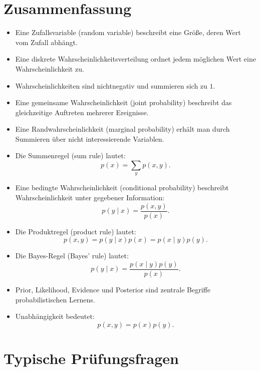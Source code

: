 \section{Zusammenfassung}

\begin{itemize}
    \item Eine Zufallsvariable (random variable) beschreibt eine Größe, deren Wert vom Zufall abhängt.
    \item Eine diskrete Wahrscheinlichkeitsverteilung ordnet jedem möglichen Wert eine Wahrscheinlichkeit zu.
    \item Wahrscheinlichkeiten sind nichtnegativ und summieren sich zu \(1\).
    \item Eine gemeinsame Wahrscheinlichkeit (joint probability) beschreibt das gleichzeitige Auftreten mehrerer Ereignisse.
    \item Eine Randwahrscheinlichkeit (marginal probability) erhält man durch Summieren über nicht interessierende Variablen.
    \item Die Summenregel (sum rule) lautet:
    \[
        p(x) = \sum_y p(x,y).
    \]
    \item Eine bedingte Wahrscheinlichkeit (conditional probability) beschreibt Wahrscheinlichkeit unter gegebener Information:
    \[
        p(y \mid x) = \frac{p(x,y)}{p(x)}.
    \]
    \item Die Produktregel (product rule) lautet:
    \[
        p(x,y) = p(y \mid x)p(x) = p(x \mid y)p(y).
    \]
    \item Die Bayes-Regel (Bayes' rule) lautet:
    \[
        p(y \mid x)
        =
        \frac{p(x \mid y)p(y)}{p(x)}.
    \]
    \item Prior, Likelihood, Evidence und Posterior sind zentrale Begriffe probabilistischen Lernens.
    \item Unabhängigkeit bedeutet:
    \[
        p(x,y) = p(x)p(y).
    \]
\end{itemize}

\section{Typische Prüfungsfragen}

